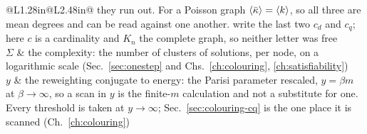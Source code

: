\begin{longtable}{@{}L{1.28in}@{\hspace{0.8em}}L{2.48in}@{}}
           they run out. For a Poisson graph $\langle \bar\kappa \rangle=\langle k \rangle$, so all
           three are mean degrees and can be read against one another.
           \citet{mulet2002} write the last two $c_{d}$ and $c_{q}$; here $c$
           is a cardinality and $K_{n}$ the complete graph, so neither letter
           was free\\[3pt]
$\Sigma$ & the complexity: the number of clusters of solutions, per node, on a
           logarithmic scale (Sec.~\ref{sec:onestep} and
           Chs.~\ref{ch:colouring}, \ref{ch:satisfiability})\\[3pt]
$y$ & the reweighting conjugate to energy: the Parisi parameter rescaled,
      $y=\beta m$ at $\beta\to\infty$, so a scan in $y$ is the finite-$m$
      calculation and not a substitute for one. Every threshold is taken at
      $y\to\infty$; Sec.~\ref{sec:colouring-cq} is the one place it is scanned
      (Ch.~\ref{ch:colouring})\\
\end{longtable}
